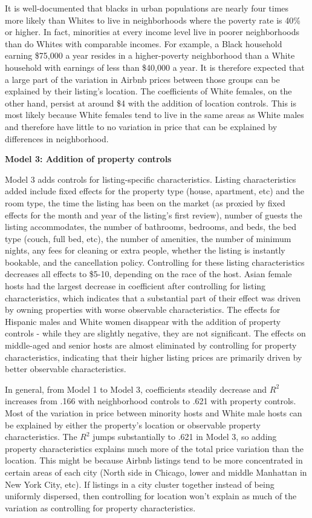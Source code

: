 \documentclass[11pt, oneside]{article}
\begin{document}
It is well-documented that blacks in urban populations are nearly four times more likely than Whites to live in neighborhoods where the poverty rate is 40\% or higher.\cite{firebaugh} In fact, minorities at every income level live in poorer neighborhoods than do Whites with comparable incomes. For example, a Black household earning \$75,000 a year resides in a higher-poverty neighborhood than a White household with earnings of less than \$40,000 a year.\cite{logan} It is therefore expected that a large part of the variation in Airbnb prices between those groups can be explained by their listing's location. The coefficients of White females, on the other hand, persist at around \$4 with the addition of location controls. This is most likely because White females tend to live in the same areas as White males and therefore have little to no variation in price that can be explained by differences in neighborhood.  

\textbf{Model 3: Addition of property controls}

Model 3 adds controls for listing-specific characteristics. Listing characteristics added include fixed effects for the property type (house, apartment, etc) and the room type, the time the listing has been on the market (as proxied by fixed effects for the month and year of the listing's first review), number of guests the listing accommodates, the number of bathrooms, bedrooms, and beds, the bed type (couch, full bed, etc), the number of amenities, the number of minimum nights, any fees for cleaning or extra people, whether the listing is instantly bookable, and the cancellation policy. Controlling for these listing characteristics decreases all effects to \$5-10, depending on the race of the host. Asian female hosts had the largest decrease in coefficient after controlling for listing characteristics, which indicates that a substantial part of their effect was driven by owning properties with worse observable characteristics. The effects for Hispanic males and White women disappear with the addition of property controls - while they are slightly negative, they are not significant. The effects on middle-aged and senior hosts are almost eliminated by controlling for property characteristics, indicating that their higher listing prices are primarily driven by better observable characteristics. 

In general, from Model 1 to Model 3, coefficients steadily decrease and $R^2$ increases from .166 with neighborhood controls to .621 with property controls. Most of the variation in price between minority hosts and White male hosts can be explained by either the property's location or observable property characteristics. The $R^2$ jumps substantially to .621 in Model 3, so adding property characteristics explains much more of the total price variation than the location. This might be because Airbnb listings tend to be more concentrated in certain areas of each city (North side in Chicago, lower and middle Manhattan in New York City, etc). If listings in a city cluster together instead of being uniformly dispersed, then controlling for location won't explain as much of the variation as controlling for property characteristics.   
\end{document}
